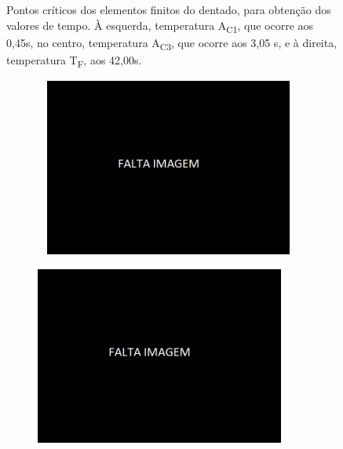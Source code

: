 \begin{figure}[htb]
\begin{subfigure}{.33\textwidth}
        \caption{}
        \label{fig:Tf_Dent}
    \end{subfigure}
    \caption[Pontos críticos dos elementos finitos do dentado]%
    {Pontos críticos dos elementos finitos do dentado, para obtenção dos valores de tempo. À esquerda, temperatura A\textsubscript{C1}, que ocorre aos 0,45s, no centro, temperatura A\textsubscript{C3}, que ocorre aos 3,05 s, e à direita, temperatura T\textsubscript{F}, aos 42,00s.}
    \label{fig:Dentado}
\end{figure}
\begin{figure}[htb]
    \centering
    \begin{subfigure}{.33\textwidth}\
        \centering
        \includegraphics[width = 0.9\textwidth]{Figures/Cap4/Falta_Imagem.png}
        \caption[]%
        {}
        \label{fig:A3_Dint}
    \end{subfigure}%
    \begin{subfigure}{.33\textwidth}
        \centering
        \includegraphics[width = 0.9\textwidth]{Figures/Cap4/Falta_Imagem.png}

\end{subfigure}
\end{figure}
